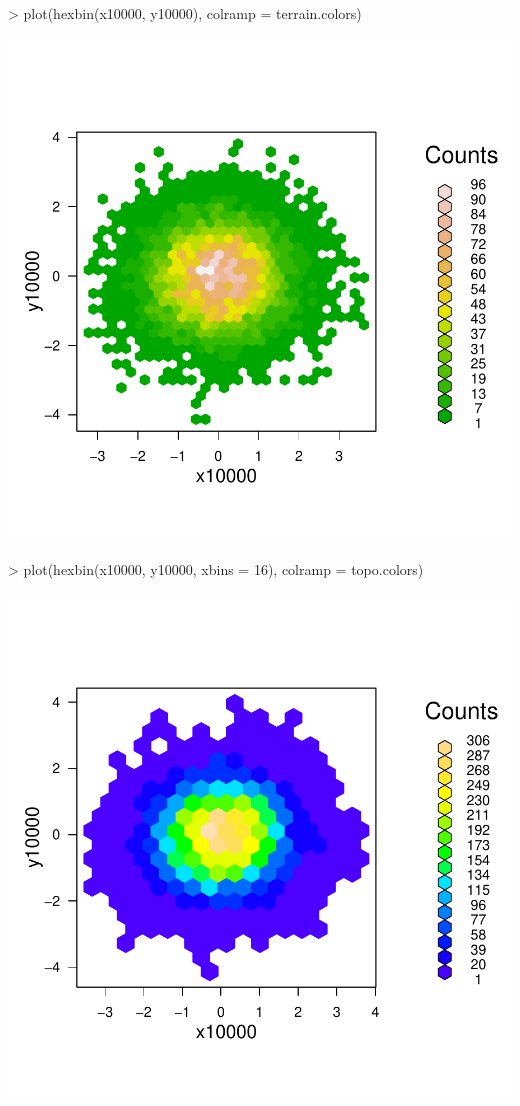\documentclass[12pt,letterpaper,final]{article}
\begin{document}
\begin{Schunk}
\begin{Sinput}
> plot(hexbin(x10000, y10000), colramp = terrain.colors)
\end{Sinput}
\end{Schunk}
\includegraphics{lect_main-013}

\begin{Schunk}
\begin{Sinput}
> plot(hexbin(x10000, y10000, xbins = 16), colramp = topo.colors)
\end{Sinput}
\end{Schunk}
\includegraphics{lect_main-014}
\end{document}
